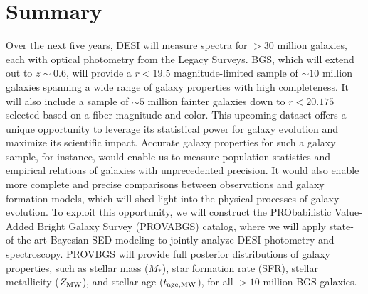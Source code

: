 \section{Summary}
Over the next five years, DESI will measure spectra for ${>}30$ million
galaxies, each with optical photometry from the Legacy Surveys. 
BGS, which will extend out to $z\sim0.6$, will provide a $r < 19.5$
magnitude-limited sample of ${\sim}10$ million galaxies spanning a wide range
of galaxy properties with high completeness.
It will also include a sample of ${\sim}5$ million fainter galaxies down to $r
< 20.175$ selected based on a fiber magnitude and color. 
This upcoming dataset offers a unique opportunity to leverage its statistical
power for galaxy evolution and maximize its scientific impact. 
Accurate galaxy properties for such a galaxy sample, for instance,  would
enable us to measure population statistics and empirical relations of galaxies
with unprecedented precision. 
It would also enable more complete and precise comparisons between observations
and galaxy formation models, which will shed light into the physical processes
of galaxy evolution.
To exploit this opportunity, we will construct the PRObabilistic Value-Added
Bright Galaxy Survey (PROVABGS) catalog, where we will apply state-of-the-art
Bayesian SED modeling to jointly analyze DESI photometry and spectroscopy. 
PROVBGS will provide full posterior distributions of galaxy properties, such as
stellar mass ($M_*$), star formation rate (SFR), stellar metallicity 
($Z_{\rm MW}$), and stellar age ($t_{\rm age, MW}$), for all ${>}10$ million BGS galaxies.

